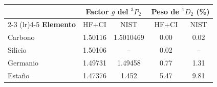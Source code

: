 \begin{tabular}{lcccc}
    \toprule
     & \multicolumn{2}{c}{\textbf{Factor $g$ del $^3P_2$}} & \multicolumn{2}{c}{\textbf{Peso de $^1D_2$ (\%)}} \\
    \cmidrule(lr){2-3} \cmidrule(lr){4-5}
    \textbf{Elemento} & HF+CI & NIST & HF+CI & NIST \\
    \midrule
    Carbono & 1.50116 & 1.5010469 & 0.00 & 0.02 \\
    Silicio & 1.50106 & -- & 0.02 & -- \\
    Germanio & 1.49731 & 1.49458 & 0.77 & 1.31 \\
    Estaño & 1.47376 & 1.452 & 5.47 & 9.81 \\
    \bottomrule
\end{tabular}
